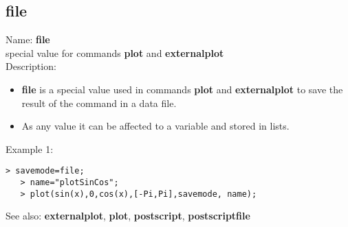 \subsection{ file }
\noindent Name: \textbf{file}\\
special value for commands \textbf{plot} and \textbf{externalplot}\\

\noindent Description: \begin{itemize}

\item \textbf{file} is a special value used in commands \textbf{plot} and \textbf{externalplot} to save
   the result of the command in a data file.

\item As any value it can be affected to a variable and stored in lists.
\end{itemize}
\noindent Example 1: 
\begin{center}\begin{minipage}{14.8cm}\begin{Verbatim}[frame=single]
   > savemode=file;
   > name="plotSinCos";
   > plot(sin(x),0,cos(x),[-Pi,Pi],savemode, name);
\end{Verbatim}
\end{minipage}\end{center}
See also: \textbf{externalplot}, \textbf{plot}, \textbf{postscript}, \textbf{postscriptfile}
